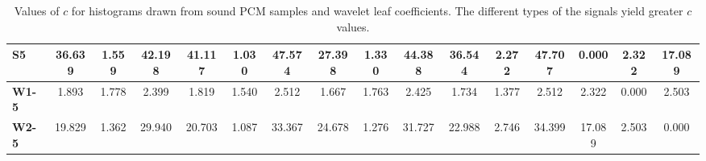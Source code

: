 \begin{table*}[h!]
\begin{center}
\begin{tabular}{| l || c | c | c || c | c | c || c | c | c || c | c | c || c | c | c |}
{\bf S5} & 36.639 & 1.559 & 42.198 & 41.117 & 1.030 & 47.574 & 27.398 & 1.330 & 44.388 & 36.544 & 2.272 & 47.707 & 0.000 & 2.322 & 17.089 \\\hline
{\bf W1-5} & 1.893 & 1.778 & 2.399 & 1.819 & 1.540 & 2.512 & 1.667 & 1.763 & 2.425 & 1.734 & 1.377 & 2.512 & 2.322 & 0.000 & 2.503 \\\hline
{\bf W2-5} & 19.829 & 1.362 & 29.940 & 20.703 & 1.087 & 33.367 & 24.678 & 1.276 & 31.727 & 22.988 & 2.746 & 34.399 & 17.089 & 2.503 & 0.000 \\\hline
\end{tabular}
\caption{Values of $c$ for histograms drawn from sound PCM samples and wavelet leaf coefficients.
The different types of the signals yield greater $c$ values.}
\end{center}
\end{table*}